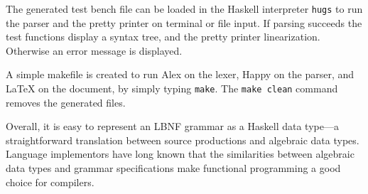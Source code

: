 
The generated test bench file can be loaded in the Haskell interpreter \texttt{hugs} to
run the parser and the pretty printer on terminal or file input.
If parsing succeeds the test functions display a syntax tree,
and the pretty printer linearization. Otherwise an error message is displayed.

A simple makefile is created to run Alex on the lexer, Happy on the parser, and
LaTeX on the document, by simply typing {\tt make}. The {\tt make clean}
command removes the generated files.


Overall, it is easy to represent an LBNF grammar as a Haskell data
type---a straightforward translation between source productions and algebraic data types. Language implementors have long known that the similarities between algebraic data types and grammar specifications make functional programming a good choice for compilers.


